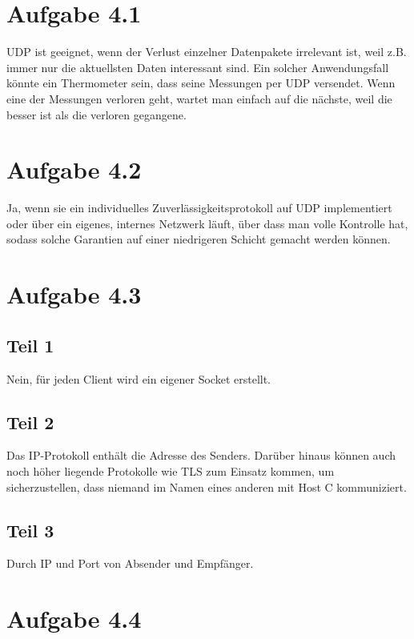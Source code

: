 \documentclass[10pt,a4paper]{article}
\begin{document}
\section{Aufgabe 4.1}

UDP ist geeignet, wenn der Verlust einzelner Datenpakete irrelevant ist, weil
z.B. immer nur die aktuellsten Daten interessant sind. Ein solcher
Anwendungsfall könnte ein Thermometer sein, dass seine Messungen per UDP
versendet. Wenn eine der Messungen verloren geht, wartet man einfach auf die
nächste, weil die besser ist als die verloren gegangene.

\section{Aufgabe 4.2}

Ja, wenn sie ein individuelles Zuverlässigkeitsprotokoll auf UDP implementiert
oder über ein eigenes, internes Netzwerk läuft, über dass man volle Kontrolle
hat, sodass solche Garantien auf einer niedrigeren Schicht gemacht werden
können.

\section{Aufgabe 4.3}

\subsection{Teil 1}

Nein, für jeden Client wird ein eigener Socket erstellt.

\subsection{Teil 2}

Das IP-Protokoll enthält die Adresse des Senders. Darüber hinaus können auch
noch höher liegende Protokolle wie TLS zum Einsatz kommen, um sicherzustellen,
dass niemand im Namen eines anderen mit Host C kommuniziert.

\subsection{Teil 3}

Durch IP und Port von Absender und Empfänger.

\section{Aufgabe 4.4}
\end{document}

